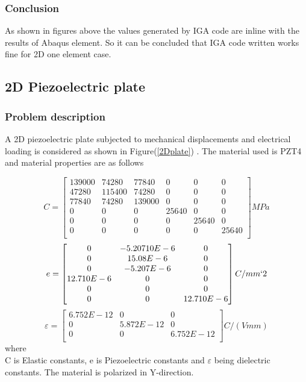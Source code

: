 \documentclass[11pt]{article}
\begin{document}
\subsubsection{Conclusion}
As shown in figures above the values generated by IGA code are inline with the results of Abaqus element. So it can be concluded that IGA code written works fine for 2D one element case.



\subsection{2D Piezoelectric plate}
\subsubsection{Problem description}
A 2D piezoelectric plate subjected to mechanical displacements and electrical
loading is considered as shown in Figure(\ref{2Dplate}) . The material used is
PZT4 and material properties are as follows

$$
C = \begin{bmatrix}
139000 & 74280 & 77840 & 0 & 0 & 0\\
47280 & 115400 & 74280 & 0 & 0 & 0\\
77840 & 74280 & 139000 & 0 & 0 & 0\\
0 & 0 & 0 & 25640 & 0 & 0\\
0 & 0 & 0 & 0 & 25640 & 0\\
0 & 0 & 0 & 0 & 0 & 25640\\
\end{bmatrix} MPa
$$  
$$
e = \begin{bmatrix}
0 & -5.20710E-6 & 0 \\
0 & 15.08E-6 & 0 \\
0 & -5.207E-6 & 0\\
12.710E-6 & 0 & 0 \\
0 & 0 & 0 \\
0 & 0 & 12.710E-6 \\
\end{bmatrix} C/ mm`2
$$
$$
\varepsilon = \begin{bmatrix}
6.752E-12 & 0 & 0 \\
0 & 5.872E-12 & 0 \\
0 & 0 & 6.752E-12\\
\end{bmatrix} C/(V mm)
$$
where \\
C is Elastic constants, e is Piezoelectric constants and $\varepsilon$ being
dielectric constants.
The material is polarized in Y-direction.
\end{document}
